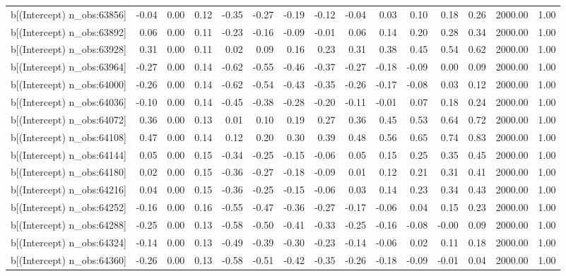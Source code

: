 \begin{table}[ht]
\begin{tabular}{rrrrrrrrrrrrrrr}
  b[(Intercept) n\_obs:63856] & -0.04 & 0.00 & 0.12 & -0.35 & -0.27 & -0.19 & -0.12 & -0.04 & 0.03 & 0.10 & 0.18 & 0.26 & 2000.00 & 1.00 \\ 
  b[(Intercept) n\_obs:63892] & 0.06 & 0.00 & 0.11 & -0.23 & -0.16 & -0.09 & -0.01 & 0.06 & 0.14 & 0.20 & 0.28 & 0.34 & 2000.00 & 1.00 \\ 
  b[(Intercept) n\_obs:63928] & 0.31 & 0.00 & 0.11 & 0.02 & 0.09 & 0.16 & 0.23 & 0.31 & 0.38 & 0.45 & 0.54 & 0.62 & 2000.00 & 1.00 \\ 
  b[(Intercept) n\_obs:63964] & -0.27 & 0.00 & 0.14 & -0.62 & -0.55 & -0.46 & -0.37 & -0.27 & -0.18 & -0.09 & 0.00 & 0.09 & 2000.00 & 1.00 \\ 
  b[(Intercept) n\_obs:64000] & -0.26 & 0.00 & 0.14 & -0.62 & -0.54 & -0.43 & -0.35 & -0.26 & -0.17 & -0.08 & 0.03 & 0.12 & 2000.00 & 1.00 \\ 
  b[(Intercept) n\_obs:64036] & -0.10 & 0.00 & 0.14 & -0.45 & -0.38 & -0.28 & -0.20 & -0.11 & -0.01 & 0.07 & 0.18 & 0.24 & 2000.00 & 1.00 \\ 
  b[(Intercept) n\_obs:64072] & 0.36 & 0.00 & 0.13 & 0.01 & 0.10 & 0.19 & 0.27 & 0.36 & 0.45 & 0.53 & 0.64 & 0.72 & 2000.00 & 1.00 \\ 
  b[(Intercept) n\_obs:64108] & 0.47 & 0.00 & 0.14 & 0.12 & 0.20 & 0.30 & 0.39 & 0.48 & 0.56 & 0.65 & 0.74 & 0.83 & 2000.00 & 1.00 \\ 
  b[(Intercept) n\_obs:64144] & 0.05 & 0.00 & 0.15 & -0.34 & -0.25 & -0.15 & -0.06 & 0.05 & 0.15 & 0.25 & 0.35 & 0.45 & 2000.00 & 1.00 \\ 
  b[(Intercept) n\_obs:64180] & 0.02 & 0.00 & 0.15 & -0.36 & -0.27 & -0.18 & -0.09 & 0.01 & 0.12 & 0.21 & 0.31 & 0.41 & 2000.00 & 1.00 \\ 
  b[(Intercept) n\_obs:64216] & 0.04 & 0.00 & 0.15 & -0.36 & -0.25 & -0.15 & -0.06 & 0.03 & 0.14 & 0.23 & 0.34 & 0.43 & 2000.00 & 1.00 \\ 
  b[(Intercept) n\_obs:64252] & -0.16 & 0.00 & 0.16 & -0.55 & -0.47 & -0.36 & -0.27 & -0.17 & -0.06 & 0.04 & 0.15 & 0.23 & 2000.00 & 1.00 \\ 
  b[(Intercept) n\_obs:64288] & -0.25 & 0.00 & 0.13 & -0.58 & -0.50 & -0.41 & -0.33 & -0.25 & -0.16 & -0.08 & -0.00 & 0.09 & 2000.00 & 1.00 \\ 
  b[(Intercept) n\_obs:64324] & -0.14 & 0.00 & 0.13 & -0.49 & -0.39 & -0.30 & -0.23 & -0.14 & -0.06 & 0.02 & 0.11 & 0.18 & 2000.00 & 1.00 \\ 
  b[(Intercept) n\_obs:64360] & -0.26 & 0.00 & 0.13 & -0.58 & -0.51 & -0.42 & -0.35 & -0.26 & -0.18 & -0.09 & -0.01 & 0.04 & 2000.00 & 1.00 \\ 

\end{tabular}
\end{table}
